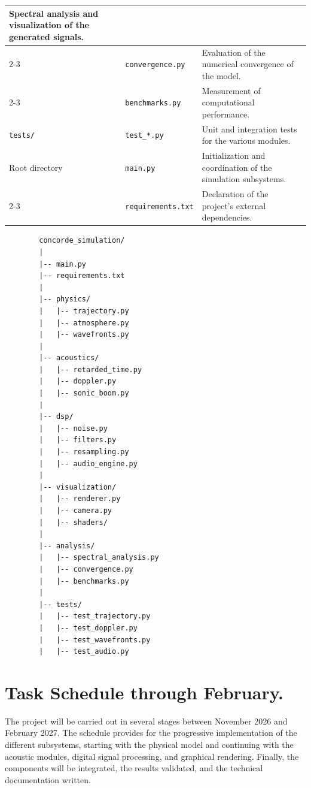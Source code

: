\documentclass[10.5pt]{article}
\begin{document}
\begin{table}[H]
\begin{tabular}{|l|p{4cm}|p{10cm}|}
			Spectral analysis and visualization of the generated signals. \\
			\cline{2-3}
			&
			\texttt{convergence.py} &
			Evaluation of the numerical convergence of the model. \\
			\cline{2-3}
			&
			\texttt{benchmarks.py} &
			Measurement of computational performance. \\
			\hline
			\texttt{tests/} &
			\texttt{test\_*.py} &
			Unit and integration tests for the various modules. \\
			\hline
			Root directory &
			\texttt{main.py} &
			Initialization and coordination of the simulation subsystems. \\
			\cline{2-3}
			&
			\texttt{requirements.txt} &
			Declaration of the project's external dependencies. \\
			\hline
		\end{tabular}
		
	\end{table}
	
	\newpage
	\begin{verbatim}
		concorde_simulation/
		|
		|-- main.py
		|-- requirements.txt
		|
		|-- physics/
		|   |-- trajectory.py
		|   |-- atmosphere.py
		|   |-- wavefronts.py
		|
		|-- acoustics/
		|   |-- retarded_time.py
		|   |-- doppler.py
		|   |-- sonic_boom.py
		|
		|-- dsp/
		|   |-- noise.py
		|   |-- filters.py
		|   |-- resampling.py
		|   |-- audio_engine.py
		|
		|-- visualization/
		|   |-- renderer.py
		|   |-- camera.py
		|   |-- shaders/
		|
		|-- analysis/
		|   |-- spectral_analysis.py
		|   |-- convergence.py
		|   |-- benchmarks.py
		|
		|-- tests/
		|   |-- test_trajectory.py
		|   |-- test_doppler.py
		|   |-- test_wavefronts.py
		|   |-- test_audio.py
	\end{verbatim}
	
	\newpage 
	
	\section{Task Schedule through February.}
	
	The project will be carried out in several stages between November 2026 and February 2027. The schedule provides for the progressive implementation of the different subsystems, starting with the physical model and continuing with the acoustic modules, digital signal processing, and graphical rendering. Finally, the components will be integrated, the results validated, and the technical documentation written.
	
\end{document}
